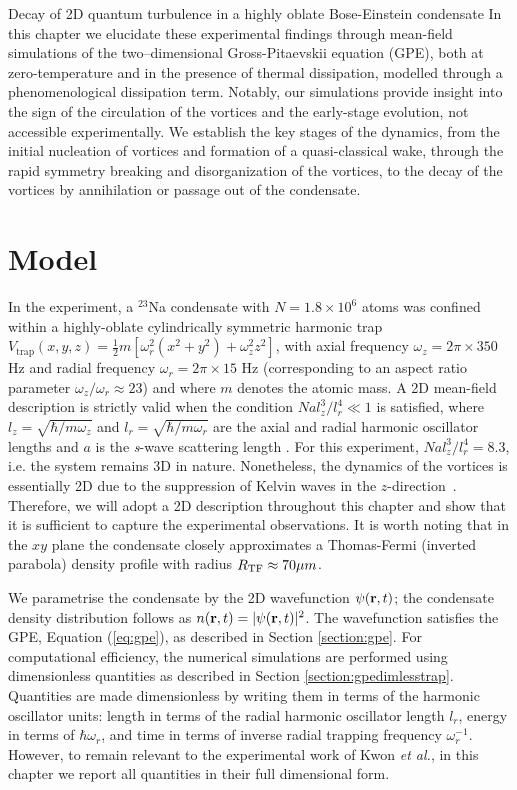 \begin{chapter}{\label{cha:shin}Decay of 2D quantum turbulence in a highly oblate Bose-Einstein condensate}
 In this chapter we elucidate these experimental
findings through mean-field simulations of the two--dimensional Gross-Pitaevskii equation (GPE), both at zero-temperature and in the presence of 
thermal dissipation, modelled through a phenomenological dissipation term.  Notably, our simulations provide insight into the sign of the circulation of the vortices and the early-stage evolution, not accessible experimentally.  We establish the key stages of the dynamics, from the initial nucleation of vortices and formation of a quasi-classical wake, through the rapid symmetry breaking and disorganization of the vortices, to the decay of the vortices by annihilation or passage out of the condensate.  

\section{Model}
In the experiment, a $^{23}$Na condensate with $N=1.8\times 10^6$ atoms was confined within a highly-oblate cylindrically symmetric harmonic trap $V_{\mathrm{trap}}(x,y,z)=\frac{1}{2}m[\omega_r^2 (x^2+y^2) +\omega_z^2 z^2 ]$, with axial frequency $\omega_z=2 \pi \times 350$ Hz and radial frequency $\omega_r=2\pi \times 15$ Hz (corresponding to an aspect ratio parameter $\omega_z/\omega_r \approx 23$) and where $m$ denotes the atomic mass.  
A 2D mean-field description is strictly valid when 
the condition $N a l_z^3/l_r^4 \ll 1$ is satisfied, 
where $l_z=\sqrt{\hbar/m \omega_z}$ and $l_r=\sqrt{\hbar/m\omega_r}$ 
are the axial and radial harmonic oscillator lengths and $a$ is 
the {\it s}-wave scattering length \cite{delgado,parker2008}.  
For this experiment, $N a l_z^3/l_r^4=8.3$, i.e. the system remains 
3D in nature.   Nonetheless, the dynamics of the vortices is essentially 2D 
due to the suppression of Kelvin waves in 
the $z$-direction~\citep{jackson_proukakis_09}.  
Therefore, we will adopt a 2D description throughout this chapter and 
show that it is sufficient to capture the experimental observations.  
It is worth noting that in the $xy$ plane the condensate 
closely approximates a Thomas-Fermi (inverted parabola) density 
profile with radius $R_{\rm TF}\approx70 \mu m$.

We parametrise the condensate by the 2D wavefunction $\psi({\bf r},t)$; the condensate density distribution follows as $n({\bf r},t)=|\psi({\bf r},t)|^2$.  The wavefunction satisfies the GPE, Equation (\ref{eq:gpe}), as described in Section \ref{section:gpe}. For computational efficiency, the numerical simulations are performed using dimensionless quantities as described in Section \ref{section:gpedimlesstrap}. Quantities are made dimensionless by writing them in terms of the harmonic oscillator units: length in terms of the radial harmonic oscillator length $l_r$, energy in terms of $\hbar\omega_r$, and time in terms of inverse radial trapping frequency $\omega_r^{-1}$. However, to remain relevant to the experimental work of Kwon {\it et al.}, in this chapter we report all quantities in their full dimensional form.


\end{chapter}
